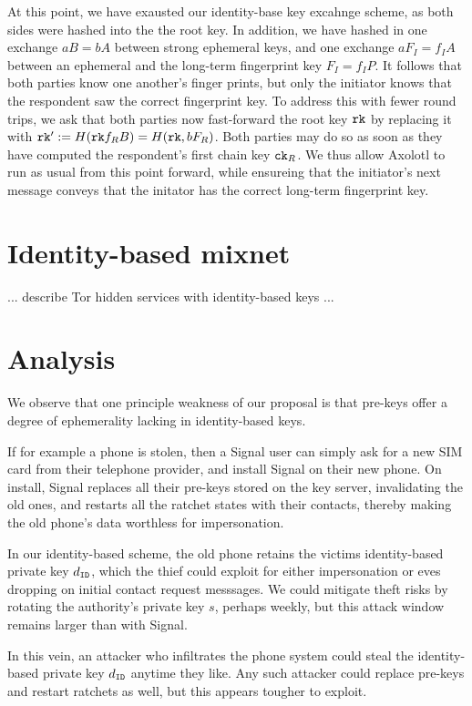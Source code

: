 \documentclass[twoside,letterpaper]{sig-alternate}
\begin{document}
At this point, we have exausted our identity-base key excahnge scheme,
 as both sides were hashed into the the root key.  In addition, we have
hashed in one exchange $a B = b A$ between strong ephemeral keys, and
one exchange $a F_I = f_I A$ between an ephemeral and
 the long-term fingerprint key $F_I = f_I P$.
It follows that both parties know one another's finger prints, but only
the initiator knows that the respondent saw the correct fingerprint key.
To address this with fewer round trips, we ask that both parties
now fast-forward the root key $\mathtt{rk}$ by replacing it with
 $\mathtt{rk}' := H(\mathtt{rk} f_R B) = H(\mathtt{rk}, b F_R )$.
Both parties may do so as soon as they have computed the respondent's
 first chain key $\mathtt{ck}_R$.
We thus allow Axolotl to run as usual from this point forward, while
ensureing that the initiator's next message conveys that the initator
 has the correct long-term fingerprint key.


\section{Identity-based mixnet} %

... describe Tor hidden services with identity-based keys ...


\section{Analysis}

We observe that one principle weakness of our proposal is that pre-keys
offer a degree of ephemerality lacking in identity-based keys.

If for example a phone is stolen, then a Signal user can simply ask
for a new SIM card from their telephone provider, and install Signal
on their new phone.  On install, Signal replaces all their pre-keys 
stored on the key server, invalidating the old ones, and restarts all
the ratchet states with their contacts, thereby making the old phone's
data worthless for impersonation. 

In our identity-based scheme, the old phone retains the victims
identity-based private key $d_{\mathtt{ID}}$, which the thief could exploit for
either impersonation or eves dropping on initial contact request messsages.
We could mitigate theft risks by rotating the authority's private key $s$,
perhaps weekly, but this attack window remains larger than with Signal.

In this vein, an attacker who infiltrates the phone system could steal
the identity-based private key $d_{\mathtt{ID}}$ anytime they like.  
Any such attacker could replace pre-keys and restart ratchets as well,
but this appears tougher to exploit.
\end{document}
